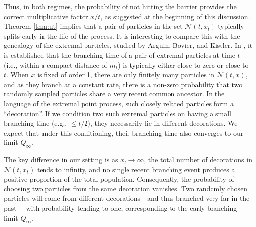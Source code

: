 \documentclass{article}
\begin{document}
Thus, in both regimes, the probability of not hitting the barrier provides the correct multiplicative factor \( x/t \), as suggested at the beginning of this discussion.\\




Theorem \ref{thm:ut} implies that a pair of particles in the set $\mathcal{N}(t,x_t)$ typically splits early in the life of the process. It is interesting to compare this with the genealogy of the extremal particles, studied by Arguin, Bovier, and Kistler. In \cite[Theorem 2.1]{Arguin2016}, it is established that the branching time of a pair of extremal particles at time $t$ (i.e., within a compact distance of $m_t$) is typically either close to zero or close to $t$. When $x$ is fixed of order 1, there are only finitely many particles in $\mathcal{N}(t,x)$, and as they branch at a constant rate, there is a non-zero probability that two randomly sampled particles share a very recent common ancestor. In the language of the extremal point process, such closely related particles form a ``decoration''. If we condition two such extremal particles on having a small branching time (e.g., $\leq t/2$), they necessarily lie in different decorations. We expect that under this conditioning, their branching time also converges to our limit $Q_\infty$.

The key difference in our setting is as $x_t \to \infty$, the total number of decorations in $\mathcal{N}(t,x_t)$ tends to infinity, and no single recent branching event produces a positive proportion of the total population. Consequently, the probability of choosing two particles from the same decoration vanishes. Two randomly chosen particles will come from different decorations—and thus branched very far in the past— with probability tending to one, corresponding to the early-branching limit $Q_\infty$.\\
\end{document}
